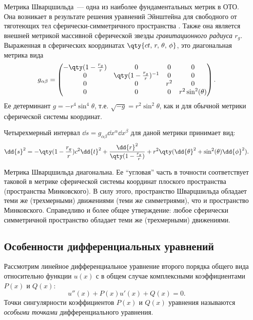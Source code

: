 \documentclass[\docroot/reports/draft/report.tex]{subfiles}
\begin{document}
    Метрика Шварцшильда~--- одна из наиболее фундаментальных метрик в ОТО. Она возникает в результате решения уравнений Эйнштейна для свободного от тяготеющих тел сферически-симметричного пространства \cite{schwarzschild_free_space_rus,mtw_v2}. Также она является внешней метрикой массивной сферической звезды \textit{гравитационного радиуса} $r_g$. Выраженная в сферических координатах $\qty{ct,\,r,\,\theta,\,\phi}$, это диагональная метрика вида
    \begin{equation}
        g_{\alpha\beta} = \begin{pmatrix}
            -\qty(1 - \frac{r_g}{r}) & 0 & 0 & 0 \\
            0 & \qty(1 - \frac{r_g}{r})^{-1} & 0 & 0 \\
            0 & 0 & r^2 & 0 \\
            0 & 0 & 0 & r^2 \sin^2(\theta)
        \end{pmatrix} .
    \end{equation}
    Ее детерминант $g = -r^4 \sin^4\theta$, т.е. $\sqrt{-g} = r^2 \sin^2\theta$, как и для обычной метрики сферической системы координат.

    Четырехмерный интервал $\dd{s} = g_{\alpha\beta} \dd{x^\alpha}\dd{x^\beta}$ для даной метрики принимает вид:
    \begin{equation}
        \dd{s}^2 = -\qty(1 - \frac{r_g}{r}) c^2 \dd{t}^2
            + \frac{\dd{r}^2}{\qty(1 - \frac{r_g}{r})}
            + r^2 \qty(\dd{\theta}^2 + \sin^2(\theta) \dd{\phi}^2) .
    \end{equation}

    Метрика Шварцшильда диагональна. Ее \enquote{угловая} часть в точности соответствует таковой в метрике сферической системы координат плоского пространства (пространства Минковского). В силу этого, пространство Шварцшильда обладает теми же (трехмерными) движениями (теми же симметриями), что и пространство Минковского. Справедливо и более общее утверждение: любое сферически симметричной пространство обладает теми же (трехмерными) движениями.

\subsection{Особенности дифференциальных уравнений}\label{sec:deq_sing}

    Рассмотрим линейное дифференциальное уравнение второго порядка общего вида относительно функции $u(x)$ с в общем случае комплексными коэффициентами $P(x)$ и $Q(x)$:
    \begin{equation}\label{eq:deq_init}
        u''(x) + P(x) u'(x) + Q(x) = 0.
    \end{equation}
    Точки сингулярности коэффициентов $P(x)$ и $Q(x)$ уравнения называются \textit{особыми точками} дифференциального уравнения.
\end{document}
